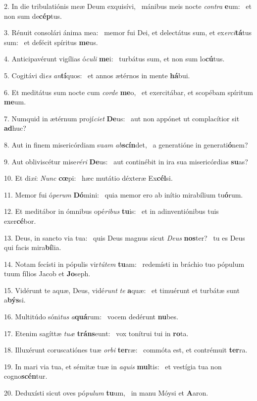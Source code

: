 2. In die tribulatiónis meæ Deum exquisívi, \dag\  mánibus meis nocte \textit{con}\textit{tra} \textbf{e}um: \ast\  et non sum de\textbf{cép}tus.\

3. Rénuit consolári ánima mea: \dag\  memor fui Dei, et delectátus sum, et ex\textit{er}\textit{ci}\textbf{tá}tus sum: \ast\  et defécit spíritus \textbf{me}us.\

4. Anticipavérunt vigílias ó\textit{cu}\textit{li} \textbf{me}i: \ast\  turbátus sum, et non sum lo\textbf{cú}tus.\

5. Cogitávi di\textit{es} \textit{an}\textbf{tí}quos: \ast\  et annos ætérnos in mente \textbf{há}bui.\

6. Et meditátus sum nocte cum \textit{cor}\textit{de} \textbf{me}o, \ast\  et exercitábar, et scopébam spíritum \textbf{me}um.\

7. Numquid in ætérnum projí\textit{ci}\textit{et} \textbf{De}us: \ast\  aut non appónet ut complacítior sit \textbf{ad}huc?\

8. Aut in finem misericórdiam su\textit{am} \textit{ab}\textbf{scín}det, \ast\  a generatióne in generati\textbf{ó}nem?\

9. Aut obliviscétur mise\textit{ré}\textit{ri} \textbf{De}us: \ast\  aut continébit in ira sua misericórdias \textbf{su}as?\

10. Et di\textit{xi}: \textit{Nunc} \textbf{cœ}pi: \ast\  hæc mutátio déxteræ Ex\textbf{cél}si.\

11. Memor fui ó\textit{pe}\textit{rum} \textbf{Dó}mini: \ast\  quia memor ero ab inítio mirabílium tu\textbf{ó}rum.\

12. Et meditábor in ómnibus opé\textit{ri}\textit{bus} \textbf{tu}is: \ast\  et in adinventiónibus tuis exer\textbf{cé}bor.\

13. Deus, in sancto via tua: \dag\  quis Deus magnus sicut \textit{De}\textit{us} \textbf{nos}ter? \ast\  tu es Deus qui facis mira\textbf{bí}lia.\

14. Notam fecísti in pópulis vir\textit{tú}\textit{tem} \textbf{tu}am: \ast\  redemísti in bráchio tuo pópulum tuum fílios Jacob et \textbf{Jo}seph.\

15. Vidérunt te aquæ, Deus, vidé\textit{runt} \textit{te} \textbf{a}quæ: \ast\  et timuérunt et turbátæ sunt a\textbf{býs}si.\

16. Multitúdo sóni\textit{tus} \textit{a}\textbf{quá}rum: \ast\  vocem dedérunt \textbf{nu}bes.\

17. Etenim sagíttæ \textit{tu}\textit{æ} \textbf{tráns}eunt: \ast\  vox tonítrui tui in \textbf{ro}ta.\

18. Illuxérunt coruscatiónes tuæ \textit{or}\textit{bi} \textbf{ter}ræ: \ast\  commóta est, et contrémuit \textbf{ter}ra.\

19. In mari via tua, et sémitæ tuæ in \textit{a}\textit{quis} \textbf{mul}tis: \ast\  et vestígia tua non cogno\textbf{scén}tur.\

20. Deduxísti sicut oves pó\textit{pu}\textit{lum} \textbf{tu}um, \ast\  in manu Móysi et \textbf{A}aron.\

